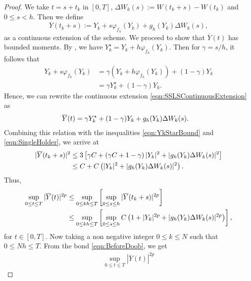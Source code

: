 	\begin{proof}
		We take $t=s+t_k$ in $ [0,T]$, $\Delta W_k(s):= W(t_k+s)- W(t_k)$ and $0\leq s <h$.
		Then we define 
		\begin{equation}\label{eqn:SSLSContinuousExtension}
			\overline{Y}(t_k+s):= Y_k + s \varphi_{f_h}(Y_k) + g_h(Y_k)\Delta W_k(s),
		\end{equation}
		as a continuous extension of the \SM scheme. We proceed to show that $\overline{Y}(t)$ has bounded moments.
		By , we have $Y_k^{\star}= Y_k + h \varphi_{f_h}(Y_k)$. 
		Then for $\gamma = s/h$, it follows that
		\begin{align*}
			Y_k + s \varphi_{f_h}(Y_k)
			&= 
			\gamma (Y_k + h \varphi_{f_h}(Y_k)) +(1-\gamma)Y_k\\
			&=
			\gamma Y_k^{\star} + (1-\gamma)Y_k.
		\end{align*}
		Hence, we can rewrite the continuous extension \eqref{eqn:SSLSContinuousExtension} as
		\begin{align}
			\overline{Y}(t) &=
			\gamma Y^{\star}_k + (1-\gamma) Y_k +g_h(Y_k) \Delta W_k(s). %
			\notag
		\end{align}
		Combining this relation with  the inequalities \eqref{eqn:YkStarBound} and \eqref{eqn:SingleHolder}, we arrive 
		at
		\begin{align}
			|\overline{Y}(t_k+s) |^2 
			&\leq
				3\left[
					\gamma C
					+
					\left(
						\gamma C +1 - \gamma
					\right)
					|Y_k|^2
					+
					|g_h(Y_k)\Delta W_k(s)|^2
			\right] \notag\\
		&\leq
			C
			+
			C
			\left(
				|Y_k|^2 + |g_h(Y_k)\Delta W_k(s)|^2
			\right).
		\notag
		\end{align}
	Thus, 
	\begin{align}
		\sup_{0\leq t\leq T} |\overline{Y}(t)|^{2p}
		&\leq
			\sup_{0\leq kh\leq T}
			\left[
				\sup_{0\leq s\leq h}
					|\overline{Y}(t_k+s)|^{2p} 
			\right] 
		\notag\\
		&\leq
			\sup_{0\leq kh\leq T} 
			\left[
				\sup_{0\leq s\leq h}
					C 
					\left(
						1 + |Y_k|^{2p} + |g_h(Y_k)\Delta W_k(s)|^{2p}
					\right)
			\right],
		\label{eqn:BeforeDoob}
	\end{align}
	for $t\in [0,T]$.
	Now taking a non negative integer $0 \leq k \leq N$ such that $0\leq Nh \leq T$. From the bond 
	\eqref{eqn:BeforeDoob}, we get
	\begin{align}
		\sup_{0\leq t\leq T} |\overline{Y}(t)|^{2p}

\end{align}
\end{proof}
